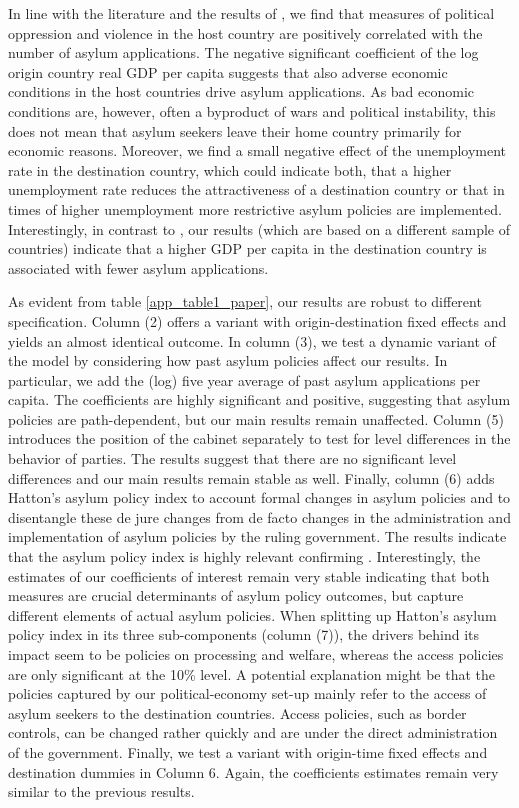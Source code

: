 \documentclass[a4paper,12pt]{article}
\begin{document}
In line with the literature and the results of \citet{hatton2016}, we find that measures of political oppression and violence in the host country are positively correlated with the number of asylum applications. The negative significant coefficient of the log origin country real GDP per capita suggests that also adverse economic conditions in the host countries drive asylum applications. As bad economic conditions are, however, often a byproduct of wars and political instability, this does not mean that asylum seekers leave their home country primarily for economic reasons. Moreover, we find a small negative effect of the unemployment rate in the destination country, which could indicate both, that a higher unemployment rate reduces the attractiveness of a destination country or that in times of higher unemployment more restrictive asylum policies are implemented. Interestingly, in contrast to \citet{hatton2016}, our results (which are based on a different sample of countries) indicate that a higher GDP per capita in the destination country is associated with fewer asylum applications. 

As evident from table \ref{app_table1_paper}, our results are robust to different specification. Column (2) offers a variant with origin-destination fixed effects and yields an almost identical outcome. In column (3), we test a dynamic variant of the model by considering how past asylum policies affect our results. In particular, we add the (log) five year average of past asylum applications per capita. The coefficients are highly significant and positive, suggesting that asylum policies are path-dependent, but our main results remain unaffected. Column (5) introduces the position of the cabinet separately to test for level differences in the behavior of parties. The results suggest that there are no significant level differences and our main results remain stable as well. Finally, column (6) adds Hatton's asylum policy index to account formal changes in asylum policies and to disentangle these de jure changes from de facto changes in the administration and implementation of asylum policies by the ruling government. The results indicate that the asylum policy index is highly relevant confirming \citet{hatton2016}. Interestingly, the estimates of our coefficients of interest remain very stable indicating that both measures are crucial determinants of asylum policy outcomes, but capture different elements of actual asylum policies. When splitting up Hatton's asylum policy index in its three sub-components (column (7)), the drivers behind its impact seem to be policies on processing and welfare, whereas the access policies are only significant at the 10\% level. A potential explanation might be that the policies captured by our political-economy set-up mainly refer to the access of asylum seekers to the destination countries. Access policies, such as border controls, can be changed rather quickly and are under the direct administration of the government. Finally, we test a variant with origin-time fixed effects and destination dummies in Column 6. Again, the coefficients estimates remain very similar to the previous results. 
\end{document}
